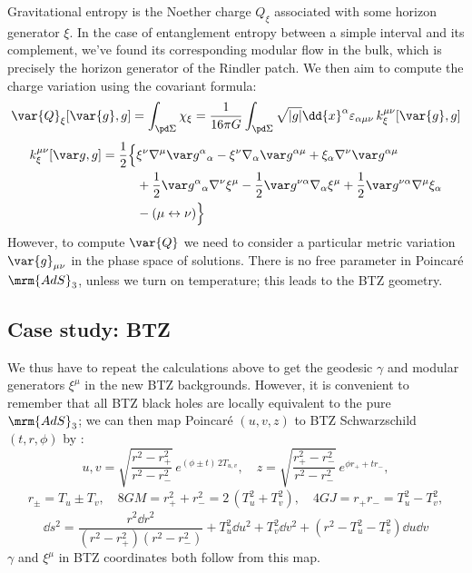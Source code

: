 \documentclass[a4paper
	,10pt
]{article}
\begin{document}
	Gravitational entropy is the Noether charge $Q_\xi$ associated with some horizon generator $\xi$. In the case of entanglement entropy between a simple interval and its complement, we've found its corresponding modular flow in the bulk, which is precisely the horizon generator of the Rindler patch. We then aim to compute the charge variation using the covariant formula:
	\begin{equation}
		\var{Q}_{\xi} [\var{g}, g]
		= \int_{\pd\Sigma}
			\chi_\xi
		= \frac{1}{16 \pi G}
			\int_{\pd\Sigma}
			\sqrt{|g|} \dd{x}^{\alpha}
				\varepsilon_{\alpha\mu\nu}\,
				k_\xi^{\mu\nu} [\var{g}, g]
	\end{equation}
	\begin{equation}
	\begin{aligned}
		k_\xi^{\mu\nu}[\var g, g]
		= \frac{1}{2} \Big \{
		& \xi^{\nu}\nabla^{\mu} \var g^{\alpha}{}_{\alpha}
		- \xi^{\nu} \nabla_{\alpha} \var g^{\alpha\mu}
		+ \xi_{\alpha} \nabla^{\nu} \var g^{\alpha\mu}  \\
		&+ \frac{1}{2} \var g^{\alpha}{}_{\alpha} \nabla^{\nu} \xi^{\mu}
		- \frac{1}{2} \var g^{\nu\alpha} \nabla_{\alpha}\xi^{\mu}
		+ \frac{1}{2} \var g^{\nu\alpha} \nabla^{\mu} \xi_{\alpha} \\
		&- (\mu \leftrightarrow \nu) \Big \}
	\end{aligned}
	\label{kdef}
	\end{equation}
	However, to compute $\var{Q}$ we need to consider a particular metric variation $\var{g}_{\mu\nu}$ in the phase space of solutions. There is no free parameter in Poincar\'e $\mrm{AdS}_3$, unless we turn on temperature; this leads to the BTZ geometry. 
\subsection{Case study: BTZ}
	We thus have to repeat the calculations above to get the geodesic $\gamma$ and modular generators $\xi^\mu$ in the new BTZ backgrounds. However, it is convenient to remember that all BTZ black holes are locally equivalent to the pure $\mrm{AdS}_3$; we can then map Poincar\'e $(u,v,z)$ to BTZ Schwarzschild $(t,r,\phi)$ by \cite{Hubeny:2007xt}:
	\begin{equation}
		u,v = \sqrt{\frac{r^2 - r_+^2}{r^2 - r_-^2}}\,
			e^{(\phi\pm t)\,2T_{u,v}},
	\quad
		z = \sqrt{\frac{r_+^2 - r_-^2}{r^2 - r_-^2}}\,
			e^{\phi r_+ + t r_-},
	\end{equation}
	\begin{gather}
		r_\pm = T_u \pm T_v,
	\quad
		8GM = r_+^2 + r_-^2
		= 2\,(T_u^2 + T_v^2),
	\quad
		4GJ = r_+ r_-
		= T_u^2 - T_v^2,
	\end{gather}
	\begin{equation}
		\dd{s}^2
		= \frac{r^2 \dd{r}^2}{
				(r^2 - r_+^2)
				(r^2 - r_-^2)
			}
			+ T_u^2 \dd{u}^2
			+ T_v^2 \dd{v}^2
			+ (r^2 - T_u^2 - T_v^2) \dd{u} \dd{v}
	\end{equation}
	$\gamma$ and $\xi^\mu$ in BTZ coordinates both follow from this map. 
	
\end{document}
